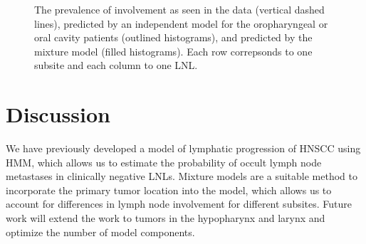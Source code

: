 \documentclass[11pt,twocolumn,twoside]{article}
\begin{document}
\begin{figure}


\caption{\label{fig-prevalence-comparison}The prevalence of involvement
as seen in the data (vertical dashed lines), predicted by an independent
model for the oropharyngeal or oral cavity patients (outlined
histograms), and predicted by the mixture model (filled histograms).
Each row correpsonds to one subsite and each column to one LNL.}

\end{figure}%

\section{Discussion}\label{sec-discussion}

We have previously developed a model of lymphatic progression of HNSCC
using HMM, which allows us to estimate the probability of occult lymph
node metastases in clinically negative LNLs. Mixture models are a
suitable method to incorporate the primary tumor location into the
model, which allows us to account for differences in lymph node
involvement for different subsites. Future work will extend the work to
tumors in the hypopharynx and larynx and optimize the number of model
components.

\printbibliography
\end{document}
